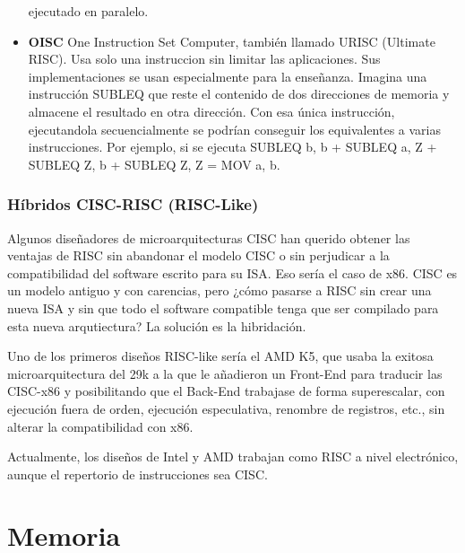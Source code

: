 \documentclass[a4paper, 11pt, titlepage]{article}
\begin{document}
\begin{itemize}
                ejecutado en paralelo.
                \item \textbf{OISC} One Instruction Set Computer, también llamado URISC (Ultimate RISC). Usa solo una instruccion 
                sin limitar las aplicaciones. Sus implementaciones se usan especialmente para la enseñanza. Imagina una instrucción 
                SUBLEQ que reste el contenido de dos direcciones de memoria y almacene el resultado en otra dirección. Con esa única 
                instrucción, ejecutandola secuencialmente se podrían conseguir los equivalentes a varias instrucciones. Por ejemplo, 
                si se ejecuta SUBLEQ b, b + SUBLEQ a, Z + SUBLEQ Z, b + SUBLEQ Z, Z = MOV a, b.            
            \end{itemize}

        \subsubsection{Híbridos CISC-RISC (RISC-Like)}

            Algunos diseñadores de microarquitecturas CISC han querido obtener las ventajas de RISC sin abandonar el modelo CISC o sin 
            perjudicar a la compatibilidad del software escrito para su ISA. Eso sería el caso de x86. CISC es un modelo antiguo y con 
            carencias, pero ¿cómo pasarse a RISC sin crear una nueva ISA y sin que todo el software compatible tenga que ser compilado 
            para esta nueva arqutiectura? La solución es la hibridación.

            Uno de los primeros diseños RISC-like sería el AMD K5, que usaba la exitosa microarquitectura del 29k a la que le añadieron 
            un Front-End para traducir las CISC-x86 y posibilitando que el Back-End trabajase de forma superescalar, con ejecución fuera 
            de orden, ejecución especulativa, renombre de registros, etc., sin alterar la compatibilidad con x86.

            Actualmente, los diseños de Intel y AMD trabajan como RISC a nivel electrónico, aunque el repertorio de instrucciones sea 
            CISC.

\section{Memoria}\label{memoria}

\end{document}
